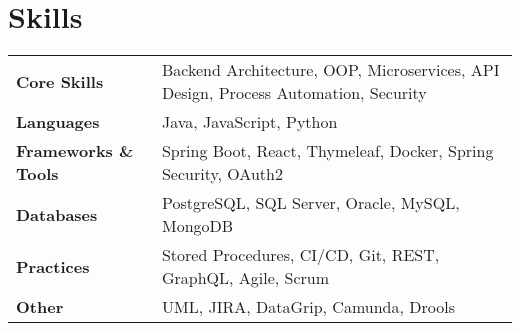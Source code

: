 \section{\textbf{Skills}}

\begin{tabularx}{\linewidth}{@{}l X@{}}
    \textbf{Core Skills} & Backend Architecture, OOP, Microservices, API Design, Process Automation, Security \\
    \textbf{Languages} & Java, JavaScript, Python \\
    \textbf{Frameworks \& Tools} & Spring Boot, React, Thymeleaf, Docker, Spring Security, OAuth2 \\
    \textbf{Databases} & PostgreSQL, SQL Server, Oracle, MySQL, MongoDB \\
    \textbf{Practices} & Stored Procedures, CI/CD, Git, REST, GraphQL, Agile, Scrum \\
    \textbf{Other} & UML, JIRA, DataGrip, Camunda, Drools \\
\end{tabularx}
